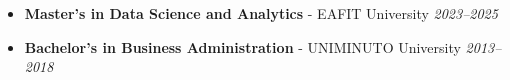 \begin{itemize}[leftmargin=*]
  \item \textbf{Master’s in Data Science and Analytics} - EAFIT University \hfill \textit{2023–2025}
  \item \textbf{Bachelor’s in Business Administration} - UNIMINUTO University \hfill \textit{2013–2018}
\end{itemize}